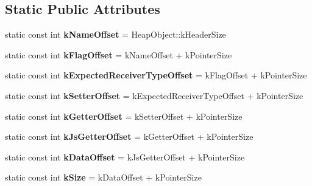 \subsection*{Static Public Attributes}
\begin{DoxyCompactItemize}
\item 
static const int {\bfseries k\+Name\+Offset} = Heap\+Object\+::k\+Header\+Size\hypertarget{classv8_1_1internal_1_1_accessor_info_a75d3700bea71b63895455a5d5cc5dae9}{}\label{classv8_1_1internal_1_1_accessor_info_a75d3700bea71b63895455a5d5cc5dae9}

\item 
static const int {\bfseries k\+Flag\+Offset} = k\+Name\+Offset + k\+Pointer\+Size\hypertarget{classv8_1_1internal_1_1_accessor_info_abc6115491f2bb799141ce228267cdeb9}{}\label{classv8_1_1internal_1_1_accessor_info_abc6115491f2bb799141ce228267cdeb9}

\item 
static const int {\bfseries k\+Expected\+Receiver\+Type\+Offset} = k\+Flag\+Offset + k\+Pointer\+Size\hypertarget{classv8_1_1internal_1_1_accessor_info_a5f52bf6fac49df3619209bcda5e68824}{}\label{classv8_1_1internal_1_1_accessor_info_a5f52bf6fac49df3619209bcda5e68824}

\item 
static const int {\bfseries k\+Setter\+Offset} = k\+Expected\+Receiver\+Type\+Offset + k\+Pointer\+Size\hypertarget{classv8_1_1internal_1_1_accessor_info_abc65c6b98df53a943293bf870b422260}{}\label{classv8_1_1internal_1_1_accessor_info_abc65c6b98df53a943293bf870b422260}

\item 
static const int {\bfseries k\+Getter\+Offset} = k\+Setter\+Offset + k\+Pointer\+Size\hypertarget{classv8_1_1internal_1_1_accessor_info_a2432493f28b06a6ff274402643c96cd5}{}\label{classv8_1_1internal_1_1_accessor_info_a2432493f28b06a6ff274402643c96cd5}

\item 
static const int {\bfseries k\+Js\+Getter\+Offset} = k\+Getter\+Offset + k\+Pointer\+Size\hypertarget{classv8_1_1internal_1_1_accessor_info_aff59be71d0caa1979f2a907451ad5593}{}\label{classv8_1_1internal_1_1_accessor_info_aff59be71d0caa1979f2a907451ad5593}

\item 
static const int {\bfseries k\+Data\+Offset} = k\+Js\+Getter\+Offset + k\+Pointer\+Size\hypertarget{classv8_1_1internal_1_1_accessor_info_a3b175d886897a1f79c9d75900637642d}{}\label{classv8_1_1internal_1_1_accessor_info_a3b175d886897a1f79c9d75900637642d}

\item 
static const int {\bfseries k\+Size} = k\+Data\+Offset + k\+Pointer\+Size\hypertarget{classv8_1_1internal_1_1_accessor_info_a0fbd2218bb9f31efd29c8b17d4f1908a}{}\label{classv8_1_1internal_1_1_accessor_info_a0fbd2218bb9f31efd29c8b17d4f1908a}

\end{DoxyCompactItemize}
